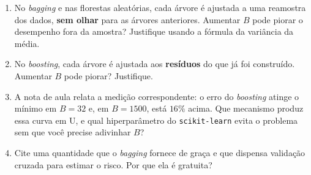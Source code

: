 \documentclass[11pt,a4paper]{article}
\begin{document}
\begin{exercicio}
\begin{enumerate}[label=(\alph*),leftmargin=1.1cm]
  \item No \emph{bagging} e nas florestas aleatórias, cada árvore é ajustada a
        uma reamostra dos dados, \textbf{sem olhar} para as árvores anteriores.
        Aumentar $B$ pode piorar o desempenho fora da amostra? Justifique usando
        a fórmula da variância da média.
  \item No \emph{boosting}, cada árvore é ajustada aos \textbf{resíduos} do que
        já foi construído. Aumentar $B$ pode piorar? Justifique.
  \item A nota de aula relata a medição correspondente: o erro do \emph{boosting}
        atinge o mínimo em $B=32$ e, em $B=1500$, está $16\%$ acima. Que
        mecanismo produz essa curva em U, e qual hiperparâmetro do
        \texttt{scikit-learn} evita o problema sem que você precise adivinhar
        $B$?
  \item Cite uma quantidade que o \emph{bagging} fornece de graça e que dispensa
        validação cruzada para estimar o risco. Por que ela é gratuita?
\end{enumerate}
\end{exercicio}
\end{document}
